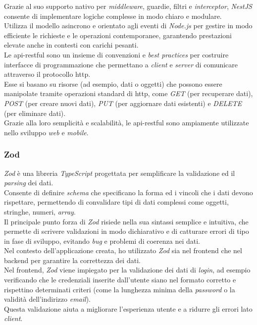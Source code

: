 \noindent Grazie al suo supporto nativo per \textit{middleware}, guardie, filtri e \textit{interceptor}, \textit{NestJS} consente di implementare logiche complesse in modo chiaro e modulare.\\
Utilizza il modello asincrono e orientato agli eventi di \textit{Node.js} per gestire in modo efficiente le richieste e le operazioni contemporanee, garantendo prestazioni elevate anche in contesti con carichi pesanti.\\

\noindent Le \gls{api-restful} sono un insieme di convenzioni e \textit{best practices} per costruire interfacce di programmazione che permettano a \textit{client} e \textit{server} di comunicare attraverso il protocollo \gls{http}.\\
Esse si basano su risorse (ad esempio, dati o oggetti) che possono essere manipolate tramite operazioni standard di \gls{http}, come \textit{GET} (per recuperare dati), \textit{POST} (per creare nuovi dati), \textit{PUT} (per aggiornare dati esistenti) e \textit{DELETE} (per eliminare dati).\\
Grazie alla loro semplicità e scalabilità, le \gls{api-restful} sono ampiamente utilizzate nello sviluppo \textit{web} e \textit{mobile}.

\subsubsection{Zod}

\textit{Zod} è una libreria \textit{TypeScript} progettata per semplificare la validazione ed il \textit{parsing} dei dati. \\
Consente di definire \textit{schema} che specificano la forma ed i vincoli che i dati devono rispettare, permettendo di convalidare tipi di dati complessi come oggetti, stringhe, numeri, \textit{array}.\\
Il principale punto forza di \textit{Zod} risiede nella sua sintassi semplice e intuitiva, che permette di scrivere validazioni in modo dichiarativo e di catturare errori di tipo in fase di sviluppo, evitando \textit{bug} e problemi di coerenza nei dati.\\

\noindent Nel contesto dell'applicazione creata, ho utilizzato \textit{Zod} sia nel \gls{frontend} che nel \gls{backend} per garantire la correttezza dei dati.\\
Nel \gls{frontend}, \textit{Zod} viene impiegato per la validazione dei dati di \textit{login}, ad esempio verificando che le credenziali inserite dall'utente siano nel formato corretto e rispettino determinati criteri (come la lunghezza minima della \textit{password} o la validità dell'indirizzo \textit{email}).\\
Questa validazione aiuta a migliorare l'esperienza utente e a ridurre gli errori lato \textit{client}.\\

